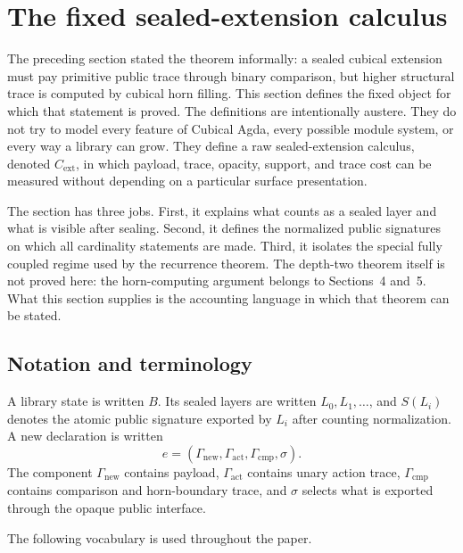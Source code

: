 \section{The fixed sealed-extension calculus}

The preceding section stated the theorem informally: a sealed cubical extension must pay
primitive public trace through binary comparison, but higher structural trace is computed by
cubical horn filling.  This section defines the fixed object for which that statement is
proved.  The definitions are intentionally austere.  They do not try to model every feature
of Cubical Agda, every possible module system, or every way a library can grow.  They define
a raw sealed-extension calculus, denoted \(C_{\mathrm{ext}}\), in which payload, trace,
opacity, support, and trace cost can be measured without depending on a particular surface
presentation.

The section has three jobs.  First, it explains what counts as a sealed layer and what is
visible after sealing.  Second, it defines the normalized public signatures on which all
cardinality statements are made.  Third, it isolates the special fully coupled regime used by
the recurrence theorem.  The depth-two theorem itself is not proved here: the horn-computing
argument belongs to Sections~4 and~5.  What this section supplies is the accounting language
in which that theorem can be stated.

\subsection{Notation and terminology}

A library state is written \(B\).  Its sealed layers are written \(L_0,L_1,\ldots\), and
\(S(L_i)\) denotes the atomic public signature exported by \(L_i\) after counting
normalization.  A new declaration is written
\[
  e=(\Gamma_{\mathrm{new}},\Gamma_{\mathrm{act}},\Gamma_{\mathrm{cmp}},\sigma).
\]
The component \(\Gamma_{\mathrm{new}}\) contains payload, \(\Gamma_{\mathrm{act}}\) contains
unary action trace, \(\Gamma_{\mathrm{cmp}}\) contains comparison and horn-boundary trace, and
\(\sigma\) selects what is exported through the opaque public interface.

The following vocabulary is used throughout the paper.


